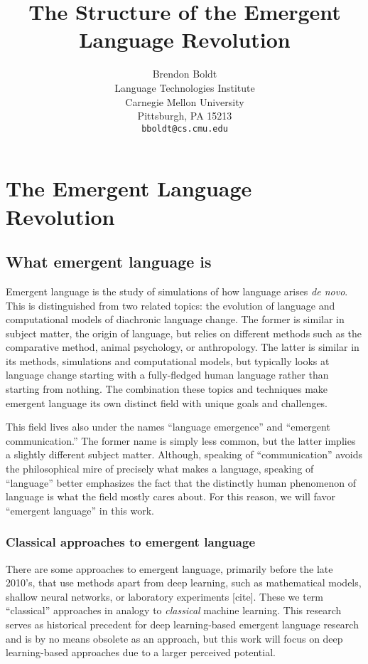 \documentclass[letterpaper]{report}
\title{The Structure of the Emergent Language Revolution}
\author{%
  Brendon Boldt\\
  Language Technologies Institute\\
  Carnegie Mellon University\\
  Pittsburgh, PA 15213 \\
  \texttt{bboldt@cs.cmu.edu} \\
}
\newcommand\cmg[1]{{\color{gray}[#1]}}
\begin{document}
\maketitle

\setcounter{tocdepth}{1}
\tableofcontents



\chapter{The Emergent Language Revolution}
\section{What emergent language is}
Emergent language is the study of simulations of how language arises \emph{de novo}.
This is distinguished from two related topics: the evolution of language and computational models of diachronic language change.
The former is similar in subject matter, the origin of language, but relies on different methods such as the comparative method, animal psychology, or anthropology.
The latter is similar in its methods, simulations and computational models, but typically looks at language change starting with a fully-fledged human language rather than starting from nothing.
The combination these topics and techniques make emergent language its own distinct field with unique goals and challenges.

This field lives also under the names ``language emergence'' and ``emergent communication.''
The former name is simply less common, but the latter implies a slightly different subject matter.
Although, speaking of ``communication'' avoids the philosophical mire of precisely what makes a language, speaking of ``language'' better emphasizes the fact that the distinctly human phenomenon of language is what the field mostly cares about.
For this reason, we will favor ``emergent language'' in this work.

\subsection{Classical approaches to emergent language}
There are some approaches to emergent language, primarily before the late 2010's, that use methods apart from deep learning, such as mathematical models, shallow neural networks, or laboratory experiments \cmg{cite}.
These we term ``classical'' approaches in analogy to \emph{classical} machine learning.
This research serves as historical precedent for deep learning-based emergent language research and is by no means obsolete as an approach, but this work will focus on deep learning-based approaches due to a larger perceived potential.
\end{document}
